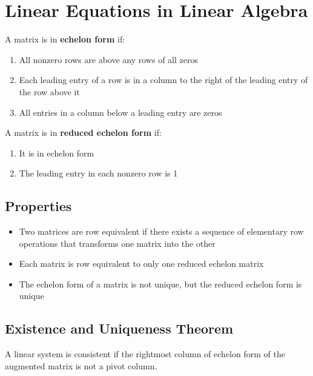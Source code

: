 \documentclass{article}
\begin{document}
\setlength{\parindent}{0pt}

\section*{Linear Equations in Linear Algebra}

A matrix is in \textbf{echelon form} if:
\begin{enumerate}
    \item All nonzero rows are above any rows of all zeros
    \item Each leading entry of a row is in a column to the right of the leading entry of the row
    above it
    \item All entries in a column below a leading entry are zeros
\end{enumerate}

\noindent
A matrix is in \textbf{reduced echelon form} if:
\begin{enumerate}
    \item It is in echelon form
    \item The leading entry in each nonzero row is 1
\end{enumerate}

\subsection*{Properties}
\begin{itemize}
    \item Two matrices are row equivalent if there exists a sequence of elementary row operations
    that transforms one matrix into the other
    \item Each matrix is row equivalent to only one reduced echelon matrix
    \item The echelon form of a matrix is not unique, but the reduced echelon form is unique
\end{itemize}

\subsection*{Existence and Uniqueness Theorem}
A linear system is consistent if the rightmost column of echelon form of the augmented matrix is
not a pivot column.
\end{document}
